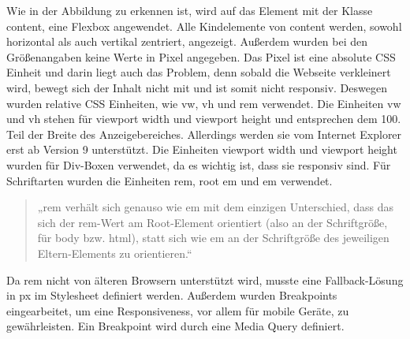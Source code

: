 Wie in der Abbildung zu erkennen ist, wird auf das Element mit der Klasse content, eine Flexbox angewendet. Alle Kindelemente von content werden, sowohl horizontal als auch vertikal zentriert, angezeigt. Außerdem wurden bei den Größenangaben keine Werte in Pixel angegeben. Das Pixel ist eine absolute CSS Einheit und darin liegt auch das Problem, denn sobald die Webseite verkleinert wird, bewegt sich der Inhalt nicht mit und ist somit nicht responsiv. Deswegen wurden relative CSS Einheiten, wie vw, vh und rem verwendet. Die Einheiten vw und vh stehen für viewport width und viewport height und entsprechen dem 100. Teil der Breite des Anzeigebereiches. Allerdings werden sie vom Internet Explorer erst ab Version 9 unterstützt. Die Einheiten viewport width und viewport height wurden für Div-Boxen verwendet, da es wichtig ist, dass sie responsiv sind.  Für Schriftarten wurden die Einheiten rem, root em und em verwendet. 
\begin{quote}
„rem verhält sich genauso wie em mit dem einzigen Unterschied, dass das sich der rem-Wert am Root-Element orientiert (also an der Schriftgröße, für body bzw. html), statt sich wie em an der Schriftgröße des jeweiligen Eltern-Elements zu orientieren.“
\end{quote}
Da rem nicht von älteren Browsern unterstützt wird, musste eine Fallback-Lösung in px im Stylesheet definiert werden.   Außerdem wurden Breakpoints eingearbeitet, um eine Responsiveness, vor allem für mobile Geräte, zu gewährleisten. Ein Breakpoint wird durch eine Media Query definiert.


